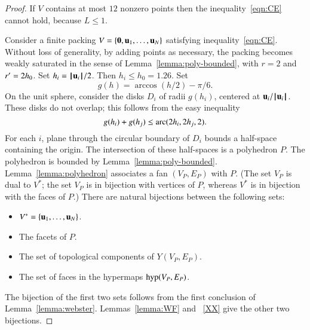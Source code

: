 \begin{proof} If $ V$ contains at most $12$ nonzero points then
the inequality~\ref{eqn:CE} cannot hold, because $L\le 1$.

Consider a finite packing $ V=\{{\mathbf 0}, {\mathbf u}_1,\ldots, {\mathbf u}_N\}$ satisfying inequality~\ref{eqn:CE}.   Without loss of generality, by adding points as necessary, the packing becomes weakly saturated in the sense of Lemma~\ref{lemma:poly-bounded}, with $r=2$ and $r'=2{h_0}$.  Set $h_i = {{\hskip0.1em|\hskip-0.15em|\hskip0.1em} {\mathbf u}_i{\hskip0.1em|\hskip-0.15em|\hskip0.1em}}/2$.  Then $h_i\le h_0=1.26$.  Set
$$
g(h) = \arccos(h/2) - \pi/6.
$$
On the unit sphere,  consider the disks $D_i$ of radii $g(h_i)$, centered at $ {\mathbf u}_i/{{\hskip0.1em|\hskip-0.15em|\hskip0.1em} {\mathbf u}_i{\hskip0.1em|\hskip-0.15em|\hskip0.1em}}$.  These disks do not overlap; this follows from the easy inequality~\cite[]{hales:2009:nonlinear} %
$$
g(h_i) + g(h_j) \le {\operatorname{arc}}(2h_i,2h_j,2).
$$
%
For each $i$, plane through the circular boundary of $D_i$ bounds a half-space containing the origin.  The intersection of these half-spaces is a polyhedron $P$.  The polyhedron is bounded by Lemma~\ref{lemma:poly-bounded}.   Lemma~\ref{lemma:polyhedron} associates a fan $(V_P,E_P)$ with $P$.    (The set $V_P$ is dual to $ V^*$; the set $V_P$ is in bijection with vertices of $P$, whereas $ V^*$ is in bijection with the faces of $P$.)  There are natural bijections between the following sets:
\begin{itemize}
\item $ V^* = \{ {\mathbf u}_1,\ldots, {\mathbf u}_N\}$.
\item The  facets of $P$.
\item The set of  topological components of $Y(V_P,E_P)$.
\item The set of faces in the hypermaps ${\operatorname{hyp}}(V_P,E_P)$.
\end{itemize}
The bijection of the first two sets follows from the first conclusion of Lemma~\ref{lemma:webster}.
Lemmas~\ref{lemma:WF} and ~\ref{XX} give the other two bijections.


\end{proof}
